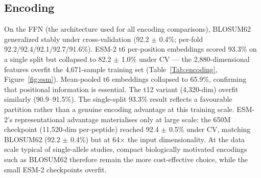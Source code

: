 \subsection{Encoding}
On the FFN (the architecture used for all encoding comparisons), BLOSUM62 generalized stably under cross-validation (92.2 $\pm$ 0.4\%; per-fold 92.2/92.4/92.1/92.7/91.6\%). ESM-2 t6 per-position embeddings scored 93.3\% on a single split but collapsed to 82.2 $\pm$ 1.0\% under CV --- the 2,880-dimensional features overfit the 4,671-sample training set (Table~\ref{Tab:encoding}, Figure~\ref{fig:esm}). Mean-pooled t6 embeddings collapsed to 65.9\%, confirming that positional information is essential. The t12 variant (4,320-dim) overfit similarly (90.9--91.5\%). The single-split 93.3\% result reflects a favourable partition rather than a genuine encoding advantage at this training scale. ESM-2's representational advantage materialises only at large scale: the 650M checkpoint (11,520-dim per-peptide) reached 92.4 $\pm$ 0.5\% under CV, matching BLOSUM62 (92.2 $\pm$ 0.4\%) but at 64$\times$ the input dimensionality. At the data scale typical of single-allele studies, compact biologically motivated encodings such as BLOSUM62 therefore remain the more cost-effective choice, while the small ESM-2 checkpoints overfit.

